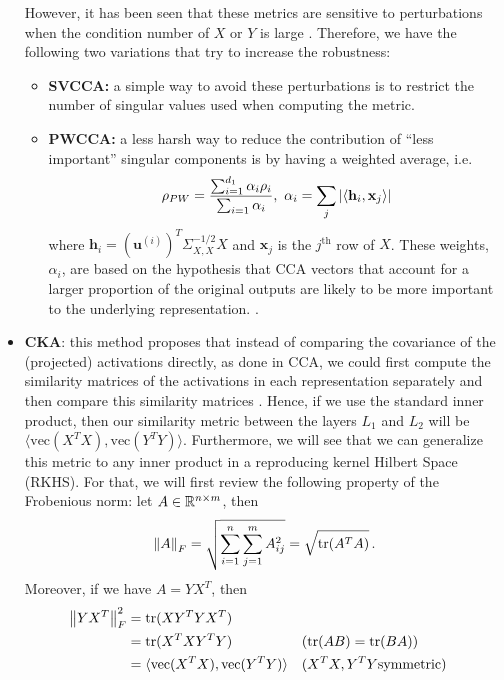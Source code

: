 \documentclass[../main.tex]{subfiles}
\begin{document}
\begin{itemize}
    However, it has been seen that these metrics are sensitive to perturbations when the condition number of $X$ or $Y$ is large \cite{kornblith_similarity_2019}. Therefore, we have the following two variations that try to increase the robustness:
    \begin{itemize}
        \item \textbf{SVCCA:} a simple way to avoid these perturbations is to restrict the number of singular values used when computing the metric.
        \item \textbf{PWCCA:} a less harsh way to reduce the contribution of ``less important'' singular components is by having a weighted average, i.e.
        \[
        \rho_{PW} = \frac{\sum_{i=1}^{d_1}\alpha_i \rho_i}{\sum_{i=1}\alpha_i},\ \alpha_i = \sum_j \left\lvert \langle 
\mathbf{h}_i, \mathbf{x}_j \rangle \right\rvert
        \]
        where $\mathbf{h}_i = (\mathbf{u}^{(i)})^T\Sigma_{X, X}^{-1/2}X $ and $\mathbf{x}_j$ is the $j^{\text{th}}$ row of $X$. These weights, $\alpha_i$, are based on the hypothesis that CCA vectors that account for a larger proportion of the original outputs are likely to be more important to the underlying representation. \cite{morcos_insights_2018}.
    \end{itemize}

    \item \textbf{CKA}: this method proposes that instead of comparing the covariance of the (projected) activations directly, as done in CCA, we could first compute the similarity matrices of the activations in each representation separately and then compare this similarity matrices \cite{kornblith_similarity_2019}. Hence, if we use the standard inner product, then our similarity metric between the layers $L_1$ and $L_2$ will be $\langle \text{vec}(X^T X), \text{vec}(Y^T Y) \rangle$. Furthermore, we will see that we can generalize this metric to any inner product in a reproducing kernel Hilbert Space (RKHS). For that, we will first review the following property of the Frobenious norm: let $A \in \mathbb{R}^{n \times m}$, then
    \[
    \left\lVert A \right\rVert_F = \sqrt{\sum_{i=1}^n\sum_{j=1}^m A_{ij}^2} = \sqrt{\text{tr}(A^TA)}\,.
    \]
    Moreover, if we have $A=Y X^T$, then
    \begin{align*}
    \left\lVert Y X^T \right\rVert_F^2 &= \text{tr}(X Y^T Y X^T) \\
    &= \text{tr}(X^T X Y^T Y) &&(\text{tr}(AB) = \text{tr}(BA))\\
    &= \langle \text{vec}(X^TX), \text{vec}(Y^TY) \rangle && (X^TX, Y^TY \text{symmetric})
    \end{align*}
    

\end{itemize}
\end{document}

